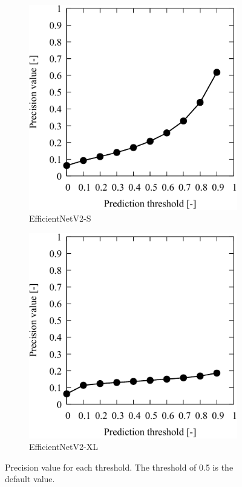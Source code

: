 \begin{figure}[H]
    \centering
    \begin{subfigure}[t]{0.45\linewidth}
        \includegraphics[width=\linewidth]{./Figure/4_Results/training/sresult/precision.pdf}
        \caption{EfficientNetV2-S}
        \label{fig:precisionResult:s}
    \end{subfigure}
    \hfill
    \begin{subfigure}[t]{0.45\linewidth}
        \includegraphics[width=\linewidth]{./Figure/4_Results/training/xlresult/precision.pdf}
        \caption{EfficientNetV2-XL}
        \label{fig:precisionResult:xl}
    \end{subfigure}

    \caption{Precision value for each threshold. The threshold of \num{0.5} is the default value.} 
    \label{fig:precisionResult}
\end{figure}

